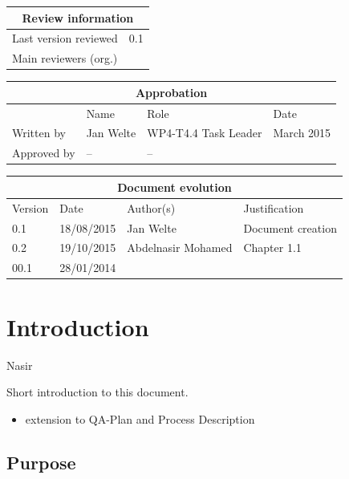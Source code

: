 \begin{tabular}{|p{4.4cm}|p{8.7cm}|}
\hline
\multicolumn{2}{|c|}{Review information} \\
\hline
Last version reviewed & 0.1 \\
\hline
Main reviewers (org.) & \\
\hline
\end{tabular}

\begin{tabular}{|p{2.2cm}|p{4cm}|p{4cm}|p{2cm}|}
\hline
\multicolumn{4}{|c|}{Approbation} \\
\hline
  &  Name & Role & Date   \\
\hline  
Written by    &  Jan Welte & WP4-T4.4 Task Leader  &  March 2015\\
\hline
Approved by & -- & -- & \\
\hline
\end{tabular}

\begin{tabular}{|p{2.2cm}|p{2cm}|p{4cm}|p{4cm}|}
\hline
\multicolumn{4}{|c|}{Document evolution} \\
\hline
Version &  Date & Author(s) & Justification  \\
\hline
0.1 & 18/08/2015 & Jan Welte &  Document creation \\
\hline 
0.2 & 19/10/2015 & Abdelnasir Mohamed & Chapter 1.1 \\
\hline  
00.1 & 28/01/2014 &  &   \\

\hline  
\end{tabular}
\newpage

\newpage

\mainmatter

\chapter{Introduction}
\label{sec:introduction}
 
Nasir

Short introduction to this document.
\begin{itemize}
\item extension to QA-Plan and Process Description
\end{itemize}



\section{Purpose}
\label{sec:purpose}

